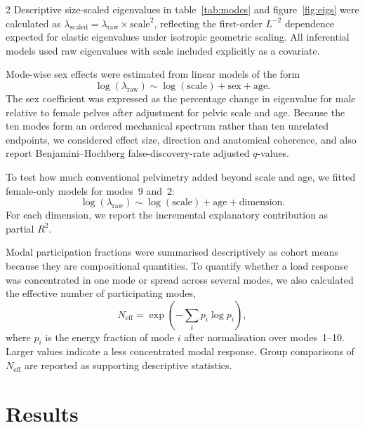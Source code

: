 \documentclass[openacc]{rsproca_new}
\begin{document}
\begin{multicols}{2}
Descriptive size-scaled eigenvalues in table~\ref{tab:modes} and figure~\ref{fig:eigs} were calculated as $\lambda_{\mathrm{scaled}}=\lambda_{\mathrm{raw}}\times \mathrm{scale}^{2}$, reflecting the first-order $L^{-2}$ dependence expected for elastic eigenvalues under isotropic geometric scaling. All inferential models used raw eigenvalues with scale included explicitly as a covariate.

Mode-wise sex effects were estimated from linear models of the form
\begin{equation}
\log(\lambda_{\mathrm{raw}}) \sim \log(\mathrm{scale}) + \mathrm{sex} + \mathrm{age}.
\end{equation}
The sex coefficient was expressed as the percentage change in eigenvalue for male relative to female pelves after adjustment for pelvic scale and age. Because the ten modes form an ordered mechanical spectrum rather than ten unrelated endpoints, we considered effect size, direction and anatomical coherence, and also report Benjamini--Hochberg false-discovery-rate adjusted $q$-values.

To test how much conventional pelvimetry added beyond scale and age, we fitted female-only models for modes~9 and~2:
\begin{equation}
\log(\lambda_{\mathrm{raw}}) \sim \log(\mathrm{scale}) + \mathrm{age} + \mathrm{dimension}.
\end{equation}
For each dimension, we report the incremental explanatory contribution as partial $R^2$.

Modal participation fractions were summarised descriptively as cohort means because they are compositional quantities. To quantify whether a load response was concentrated in one mode or spread across several modes, we also calculated the effective number of participating modes,
\begin{equation}
N_{\mathrm{eff}} = \exp\left(-\sum_i p_i\log p_i\right),
\end{equation}
where $p_i$ is the energy fraction of mode $i$ after normalisation over modes~1--10. Larger values indicate a less concentrated modal response. Group comparisons of $N_{\mathrm{eff}}$ are reported as supporting descriptive statistics.

\section{Results}

\end{multicols}
\end{document}
